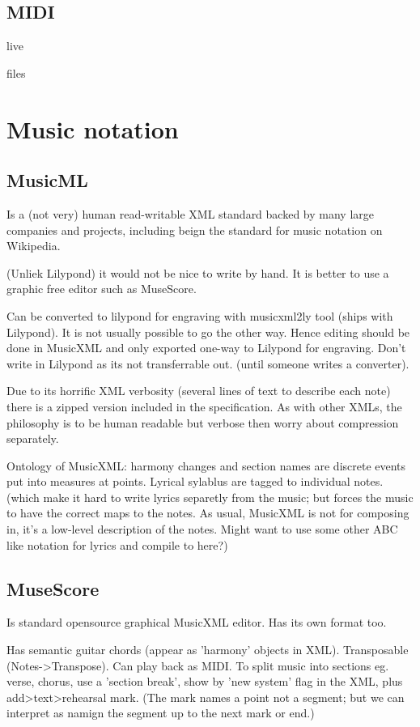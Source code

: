 \documentclass[oneside,english]{scrbook}
\begin{document}
\section{MIDI}

live

files



\chapter{Music notation}

\section{MusicML}
Is a (not very) human read-writable XML standard backed by many large companies and projects, including beign the standard for music notation on Wikipedia.

(Unliek Lilypond) it would not be nice to write by hand. It is better to use a graphic free editor such as MuseScore.

Can be converted to lilypond for engraving with musicxml2ly tool (ships with Lilypond). It is not usually possible to go the other way. Hence editing should be done in MusicXML and only exported one-way to Lilypond for engraving.  Don't write in Lilypond as its not transferrable out. (until someone writes a converter).

Due to its horrific XML verbosity (several lines of text to describe each note) there is a zipped version included in the specification. As with other XMLs, the philosophy is to be human readable but verbose then worry about compression separately.


Ontology of MusicXML: harmony changes and section names are discrete events put into measures at points.  Lyrical sylablus are tagged to individual notes. (which make it hard to write lyrics separetly from the music; but forces the music to have the correct maps to the notes.  As usual, MusicXML is not for composing in, it's a low-level description of the notes. Might want to use some other ABC like notation for lyrics and compile to here?)

\section{MuseScore}
Is standard opensource graphical MusicXML editor. Has its own format too.   

Has semantic guitar chords (appear as 'harmony' objects in XML). Transposable (Notes->Transpose). Can play back as MIDI. To split music into sections eg. verse, chorus, use a 'section break', show by 'new system' flag in the XML, plus add>text>rehearsal mark. (The mark names a point not a segment; but we can interpret as namign the segment up to the next mark or end.)
\end{document}
